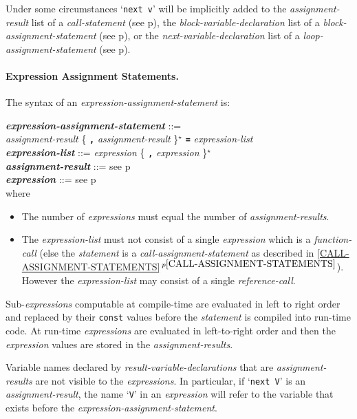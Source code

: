 \documentclass[12pt]{article}
\newcommand{\subsubsubsection}[1]{\paragraph[#1]{#1.}}
\newcommand{\TT}[1]{{\tt \bfseries #1}}
\newcommand{\STAR}{{\Large $^\star$}}
\newcommand{\emkey}[1]{{\em \bfseries #1}}
\newcommand{\itemref}[1]{\ref{#1}$\,^{p\pageref{#1}}$}
\newcommand{\pagref}[1]{p\pageref{#1}}
\newenvironment{indpar}[1][0.3in]%
	{\begin{list}{}%
		     {\setlength{\itemsep}{0in}%
		      \setlength{\topsep}{0in}%
		      \setlength{\parsep}{1ex}%
		      \setlength{\labelwidth}{#1}%
		      \setlength{\leftmargin}{#1}%
		      \addtolength{\leftmargin}{\labelsep}}%
	 \item}%
	{\end{list}}
\begin{document}
Under some circumstances `{\tt next v}' will
be implicitly added to the {\em assignment-result}
list of a {\em call-statement} (see \pagref{CALL-NEXT-PROMOTION}),
the {\em block-variable-declaration} list
of a {\em block-assignment-statement} (see \pagref{BLOCK-NEXT-PROMOTION}),
or the {\em next-variable-declaration} list of a
{\em loop-assignment-statement} (see \pagref{LOOP-NEXT-PROMOTION}).

\subsubsubsection{Expression Assignment Statements}
\label{EXPRESSION-ASSIGNMENT-STATEMENTS}

The syntax of an {\em expression-assign\-ment-statement} is:
\begin{indpar}
\emkey{expression-assignment-statement} ::= \\
\hspace*{0.5in} {\em assignment-result}
                \{ \TT{,} {\em assignment-result} \}\STAR{}
		\TT{=} {\em expression-list}
\\[0.5ex]
\emkey{expression-list}\label{EXPRESSION-LIST} ::=
	      {\em expression} \{ \TT{,} {\em expression} \}\STAR{}
\\[0.5ex]
\emkey{assignment-result} ::= see \pagref{ASSIGNMENT-RESULT}
\\[0.5ex]
\emkey{expression} ::= see \pagref{EXPRESSION}
\\[2.0ex]
where
\begin{itemize}

\item The number of {\em expressions} must equal the number
of {\em assignment-results}.

\item The {\em expression-list} must not consist of a single
{\em expression} which is a {\em function-call} (else the
{\em statement} is a {\em call-assignment-statement} as described in
\itemref{CALL-ASSIGNMENT-STATEMENTS}).  However the {\em expression-list}
may consist of a single {\em reference-call}.

\end{itemize}
\end{indpar}

Sub-{\em expressions} computable at compile-time are evaluated
in left to right order and replaced by their {\tt const} values
before the {\em statement} is compiled into run-time code.
At run-time {\em expressions} are evaluated in left-to-right order and
then the {\em expression} values are stored in the {\em assignment-results}.

Variable names declared by {\em result-variable-declarations} that are
{\em assignment-results} are not visible to the {\em expressions}.
In particular, if `{\tt next V}' is an {\em assignment-result},
the name `{\tt V}' in an {\em expression} will refer to the variable
that exists before the {\em expression-assignment-statement}.
\end{document}
